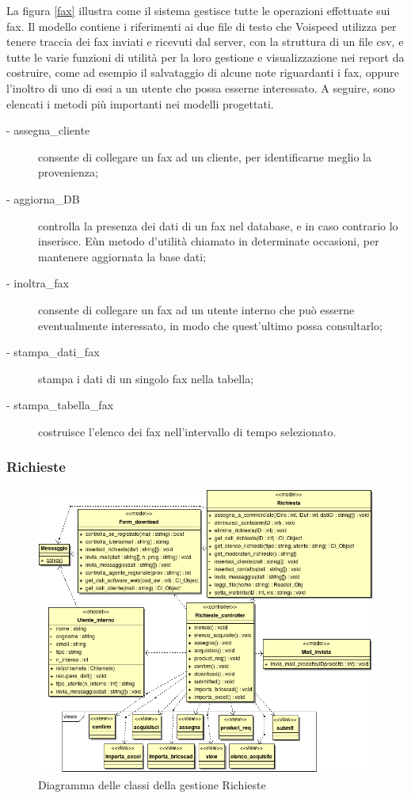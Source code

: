 \noindent
La figura \ref{fax} illustra come il sistema gestisce tutte le operazioni effettuate sui fax. Il modello contiene i riferimenti ai due file di testo che Voispeed utilizza per tenere traccia dei fax inviati e ricevuti dal server, con la struttura di un file csv, e tutte le varie funzioni di utilit\`a per la loro gestione e visualizzazione nei report da costruire, come ad esempio il salvataggio di alcune note riguardanti i fax, oppure l'inoltro di uno di essi a un utente che possa esserne interessato.
A seguire, sono elencati i metodi pi\`u importanti nei modelli progettati.
\begin{description}
\item[- assegna\_cliente] consente di collegare un fax ad un cliente, per identificarne meglio la provenienza;
\item[- aggiorna\_DB] controlla la presenza dei dati di un fax nel database, e in caso contrario lo inserisce. E\` un metodo d'utilit\`a chiamato in determinate occasioni, per mantenere aggiornata la base dati;
\item[- inoltra\_fax] consente di collegare un fax ad un utente interno che pu\`o esserne eventualmente interessato, in modo che quest'ultimo possa consultarlo;
\item[- stampa\_dati\_fax] stampa i dati di un singolo fax nella tabella;
\item[- stampa\_tabella\_fax] costruisce l'elenco dei fax nell'intervallo di tempo selezionato.
\end{description}

\newpage
\subsubsection{Richieste}
\begin{figure}[!ht]
\centering
  \includegraphics[scale=0.8]{./images/richiesteMVC.png}
\caption{Diagramma delle classi della gestione Richieste}
\label{richieste}
\end{figure}

